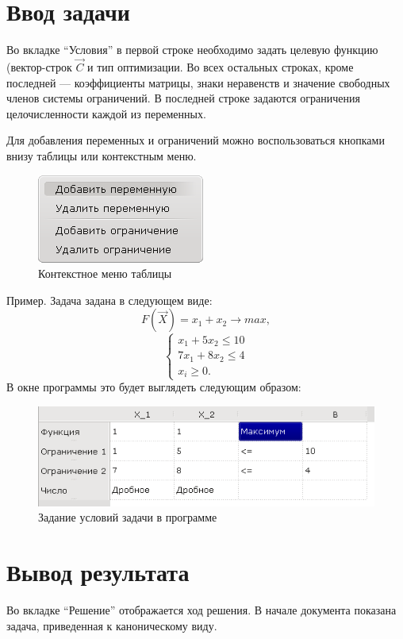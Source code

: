 \documentclass[pdftex, unicode, a4paper,12pt,oneside,utf8x, usehyperref]{report-gost}
\begin{document}
\section{Ввод задачи}
Во вкладке “Условия” в первой строке необходимо задать целевую функцию (вектор-строк $\vec{C}$ и тип оптимизации.
Во всех остальных строках, кроме последней ---  коэффициенты матрицы, знаки неравенств и значение свободных членов системы ограничений. В последней строке задаются ограничения целочисленности каждой из переменных.

Для добавления переменных и ограничений можно воспользоваться кнопками внизу таблицы или контекстным меню.
\begin{figure}[ht]
\centering
\includegraphics[scale=1.0]{img/contextmenu.png}
\caption{Контекстное меню таблицы}
\end{figure}

Пример. Задача задана в следующем виде:
\begin{equation}
 	F(\vec{X}) = x_1+x_2 \to max,
\end{equation}
\begin{equation}
\begin{cases}
x_1 + 5x_2 \le 10\\
7x_1 + 8x_2 \le 4\\
x_i \ge 0.
\end{cases}
\end{equation}
\clearpage
В окне программы это будет выглядеть следующим образом:
\begin{figure}[ht]
\centering
\includegraphics[scale=1.0]{img/problem1.png}
\caption{Задание условий задачи в программе}
\end{figure}



\section{Вывод результата}
Во вкладке “Решение” отображается ход решения. В начале документа показана задача, приведенная к каноническому виду.
\end{document}
